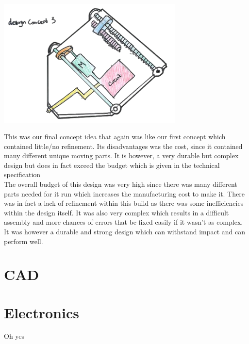 \documentclass{article}
\begin{document}
\begin{center}
	\includegraphics[width=0.7\textwidth]{images/image_8_2-Photoroom.png}
\end{center}\vspace{0.6em}\noindent
This was our final concept idea that again was like our first concept which contained little/no refinement. Its disadvantages was the cost, since it contained many different unique moving parts. It is however, a very durable but complex design but does in fact exceed the budget which is given in the technical specification\\[1em]
The overall budget of this design was very high since there was many different parts needed for it run which increases the manufacturing cost to make it. There was in fact a lack of refinement within this build as there was some inefficiencies within the design itself. It was also very complex which results in a difficult assembly and more chances of errors that be fixed easily if it wasn’t as complex. It was however a durable and strong design which can withstand impact and can perform well.

\newpage\vspace*{-20pt}
\section{CAD}


\newpage\vspace*{-20pt}
\section{Electronics}
Oh yes

\newpage
\end{document}
